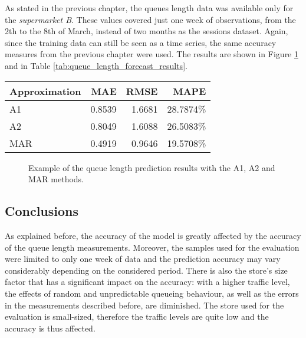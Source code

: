 As stated in the previous chapter, the queues length data was available only for the \emph{supermarket B}. These values covered just one week of observations, from the 2th to the 8th of March, instead of two months as the sessions dataset. Again, since the training data can still be seen as a time series, the same accuracy measures from the previous chapter were used. The results are shown in Figure \ref{fig:queue_length_forecast} and in Table \ref{tab:queue_length_forecast_results}.

\begin{center}
  \begin{tabular}{ l r r r }
    \hline
    Approximation & MAE    & RMSE   & MAPE      \\
    \hline
    A1            & 0.8539 & 1.6681 & 28.7874\% \\
    A2            & 0.8049 & 1.6088 & 26.5083\% \\
    MAR           & 0.4919 & 0.9646 & 19.5708\% \\
    \hline
  \end{tabular}
\end{center}

\begin{figure}
  \begin{center}
  \end{center}
  \caption{Example of the queue length prediction results with the A1, A2 and MAR methods.}
  \label{fig:queue_length_forecast}
\end{figure}

\subsection{Conclusions}

As explained before, the accuracy of the model is greatly affected by the accuracy of the queue length measurements. Moreover, the samples used for the evaluation were limited to only one week of data and the prediction accuracy may vary considerably depending on the considered period. There is also the store’s size factor that has a significant impact on the accuracy: with a higher traffic level, the effects of random and unpredictable queueing behaviour, as well as the errors in the measurements described before, are diminished. The store used for the evaluation is small-sized, therefore the traffic levels are quite low and the accuracy is thus affected.

\clearpage